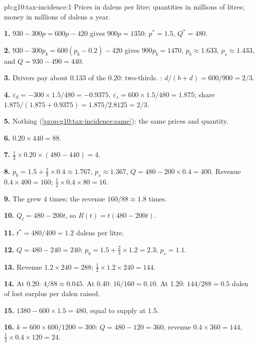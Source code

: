 \begin{solution}{pb:g10:tax-incidence:1}
Prices in dalens per litre; quantities in millions of litres; money in millions of dalens a year.

\textbf{1.} $930 - 300p = 600p - 420$ gives $900p = 1350$: $p^* = 1.5$, $Q^* = 480$.

\textbf{2.} $930 - 300p_b = 600(p_b - 0.2) - 420$ gives $900p_b = 1470$, $p_b \approx 1.633$, $p_s \approx 1.433$, and $Q = 930 - 490 = 440$.

\textbf{3.} Drivers pay about 0.133 of the 0.20: two-thirds. : $d/(b + d) = 600/900 = 2/3$.

\textbf{4.} $\varepsilon_d = -300 \times 1.5/480 = -0.9375$, $\varepsilon_s = 600 \times 1.5/480 = 1.875$; share $1.875/(1.875 + 0.9375) = 1.875/2.8125 = 2/3$.

\textbf{5.} Nothing (\cref{prop:g10:tax-incidence:same}): the same prices and quantity.

\textbf{6.} $0.20 \times 440 = 88$.

\textbf{7.} $\tfrac12 \times 0.20 \times (480 - 440) = 4$.

\textbf{8.} $p_b = 1.5 + \tfrac23 \times 0.4 \approx 1.767$, $p_s \approx 1.367$, $Q = 480 - 200 \times 0.4 = 400$. Revenue $0.4 \times 400 = 160$;  $\tfrac12 \times 0.4 \times 80 = 16$.

\textbf{9.} The  grew 4 times; the revenue $160/88 \approx 1.8$ times.

\textbf{10.} $Q_t = 480 - 200t$, so $R(t) = t(480 - 200t)$.

\textbf{11.} $t^* = 480/400 = 1.2$ dalens per litre.

\textbf{12.} $Q = 480 - 240 = 240$; $p_b = 1.5 + \tfrac23 \times 1.2 = 2.3$; $p_s = 1.1$.

\textbf{13.} Revenue $1.2 \times 240 = 288$;  $\tfrac12 \times 1.2 \times 240 = 144$.

\textbf{14.} At 0.20: $4/88 \approx 0.045$. At 0.40: $16/160 = 0.10$. At 1.20: $144/288 = 0.5$ dalen of lost surplus per dalen raised.

\textbf{15.} $1380 - 600 \times 1.5 = 480$, equal to supply at 1.5.

\textbf{16.} $k = 600 \times 600/1200 = 300$: $Q = 480 - 120 = 360$, revenue $0.4 \times 360 = 144$,  $\tfrac12 \times 0.4 \times 120 = 24$.


\end{solution}
